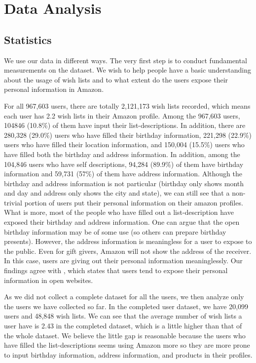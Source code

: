 \documentclass{llncs}
\begin{document}
\section{Data Analysis}
\subsection{Statistics}
We use our data in different ways. The very first step is to conduct fundamental measurements on the dataset. We wish to help people have a basic understanding about the usage of wish lists and to what extent do the users expose their personal information in Amazon. 

For all 967,603 users, there are totally 2,121,173 wish lists recorded, which means each user has 2.2 wish lists in their Amazon profile. Among the 967,603 users, 104846 (10.8\%) of them have input their list-descriptions. In addition, there are 280,328 (29.0\%) users who have filled their birthday information, 221,298 (22.9\%) users who have filled their location information, and 150,004 (15.5\%) users who have filled both the birthday and address information. In addition, among the 104,846 users who have self descriptions, 94,284 (89.9\%) of them have birthday information and 59,731 (57\%) of them have address information. Although the birthday and address information is not particular (birthday only shows month and day and address only shows the city and state), we can still see that a non-trivial portion of users put their personal information on their amazon profiles. What is more, most of the people who have filled out a list-description have exposed their birthday and address information. One can argue that the open birthday information may be of some use (so others can prepare birthday presents). However, the address information is meaningless for a user to expose to the public. Even for gift givers, Amazon will not show the address of the receiver. In this case, users are giving out their personal information meaninglessly. Our findings agree with \cite{frankowski2006you}, which states that users tend to expose their personal information in open websites. 

As we did not collect a complete dataset for all the users, we then analyze only the users we have collected so far. In the completed user dataset, we have 20,099 users and 48,848 wish lists. We can see that the average number of wish lists a user have is 2.43 in the completed dataset, which is a little higher than that of the whole dataset. We believe the little gap is reasonable because the users who have filled the list-descriptions seems using Amazon more so they are more prone to input birthday information, address information, and products in their profiles. 
\end{document}
